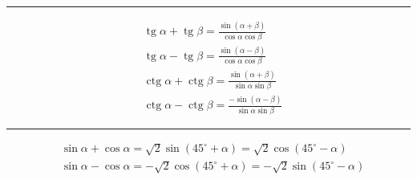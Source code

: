\documentclass[12pt,a4paper,fleqn]{article}
\DeclareMathOperator{\tg}{tg}
\DeclareMathOperator{\ctg}{ctg}
\begin{document}
	\noindent\rule{10cm}{0.4pt}
	\begin{align*}
	&\tg\alpha + \tg\beta = \frac{\sin(\alpha+\beta)}{\cos\alpha\cos\beta}\\
	&\tg\alpha - \tg\beta = \frac{\sin(\alpha-\beta)}{\cos\alpha\cos\beta}\\
	&\ctg\alpha + \ctg\beta = \frac{\sin(\alpha+\beta)}{\sin\alpha\sin\beta}\\
	&\ctg\alpha - \ctg\beta = \frac{-\sin(\alpha-\beta)}{\sin\alpha\sin\beta}
	\end{align*}
	
		
	\noindent\rule{10cm}{0.4pt}
	\begin{align*}
	&\sin\alpha+\cos\alpha = \sqrt{2}\sin(45^\circ +\alpha) = \sqrt{2}\cos(45^\circ - \alpha)\\
	&\sin\alpha - \cos\alpha = -\sqrt{2}\cos(45^\circ+\alpha) = -\sqrt{2} \sin(45^\circ-\alpha)
	\end{align*}
	
\end{document}
